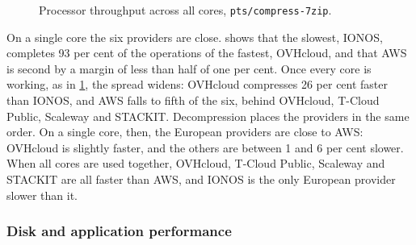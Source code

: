 \begin{figure}[htbp]
  \centering
  \caption{Processor throughput across all cores, \texttt{pts/compress-7zip}.}
  \label{fig:bench-7zip}
\end{figure}

On a single core the six providers are close.  shows that
the slowest, IONOS, completes 93 per cent of the operations of the fastest,
OVHcloud, and that \acs{AWS} is second by a margin of less than half of one per
cent. Once every core is working, as in \cref{fig:bench-7zip}, the spread widens:
OVHcloud compresses 26 per cent faster than IONOS, and \acs{AWS} falls to fifth of
the six, behind OVHcloud, T-Cloud Public, Scaleway and STACKIT. Decompression
places the providers in the same order. On a single core, then, the European
providers are close to \acs{AWS}: OVHcloud is slightly faster, and the others are
between 1 and 6 per cent slower. When all cores are used together, OVHcloud,
T-Cloud Public, Scaleway and STACKIT are all faster than \acs{AWS}, and IONOS
is the only European provider slower than it.

\subsubsection{Disk and application performance}
\label{sec:bench-disk}

